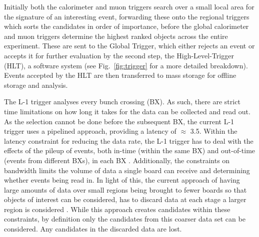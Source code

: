 Initially both the calorimeter and muon triggers search over a small local area for the signature of an interesting event, forwarding these onto the regional triggers which sorts the candidates in order of importance, before the global calorimeter and muon triggers determine the highest ranked objects across the entire experiment. 
These are sent to the Global Trigger, which either rejects an event or accepts it for further evaluation by the second step, the High-Level-Trigger (HLT), a software system (see Fig.~\ref{fig:trigger} for a more detailed breakdown). 
Events accepted by the HLT are then transferred to mass storage for offline storage and analysis\cite{oldcms}. 

The L-1 trigger analyses every bunch crossing (BX). 
As such, there are strict time limitations on how long it takes for the data can be collected and read out. 
As the selection cannot be done before the subsequent BX, the current L-1 trigger uses a pipelined approach, providing a latency of $\approx$ 3.5\mus . 
Within the latency constraint for reducing the data rate, the L-1 trigger has to deal with the effects of the pileup of events, both in-time (within the same BX) and out-of-time (events from different BXs), in each BX . 
Additionally, the constraints on bandwidth limits the volume of data a single board can receive and determining whether events being read in. 
In light of this, the current approach of having large amounts of data over small regions being brought to fewer boards so that objects of interest can be considered, has to discard data at each stage a larger region is considered . 
While this approach creates candidates within these constraints, by definition only the candidates from this coarser data set can be considered. 
Any candidates in the discarded data are lost\cite{oldcms}.

